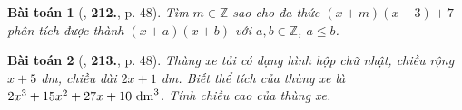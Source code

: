 \documentclass{article}
\numberwithin{equation}{section}
\newtheorem{baitoan}{Bài toán}
\begin{document}
\begin{baitoan}[\cite{Tuyen_Toan_7}, \textbf{212.}, p. 48]
	Tìm $m\in\mathbb{Z}$ sao cho đa thức $(x + m)(x - 3) + 7$ phân tích được thành $(x + a)(x + b)$ với $a,b\in\mathbb{Z}$, $a\le b$.
\end{baitoan}

\begin{baitoan}[\cite{Tuyen_Toan_7}, \textbf{213.}, p. 48]
	Thùng xe tải có dạng hình hộp chữ nhật, chiều rộng $x + 5$ \emph{dm}, chiều dài $2x + 1$ \emph{dm}. Biết thể tích của thùng xe là $2x^3 + 15x^2 + 27x + 10\ {\rm dm}^3$. Tính chiều cao của thùng xe.
\end{baitoan}


\printbibliography[heading=bibintoc]
	
\end{document}
